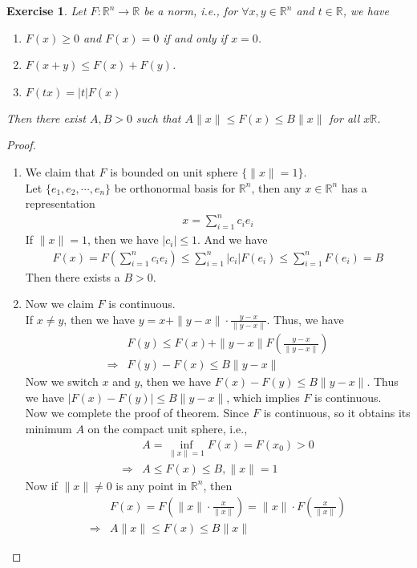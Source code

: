 \documentclass[12pt,leqno]{amsart}
\newtheorem{exercise}{Exercise}[section]
\theoremstyle{definition}
\numberwithin{equation}{subsection}
\begin{document}
\begin{exercise}
Let $F:\mathbb{R}^n\to\mathbb{R}$ be a norm, i.e., for $\forall x,y\in \mathbb{R}^n$ and $t\in\mathbb{R}$, we have
\begin{enumerate}
    \item $F(x)\geq 0$ and $F(x) = 0$ if and only if $x = 0$.
    \item $F(x+y)\leq F(x) + F(y)$.
    \item $F(tx) = |t|F(x)$
\end{enumerate}
Then there exist $A,B > 0$ such that $A\|x\|\leq F(x)\leq B\|x\|$ for all $x\mathbb{R}$.
\end{exercise}
\begin{proof}
~\begin{enumerate}
    \item We claim that $F$ is bounded on unit sphere $\{\|x\| = 1\}$. \\
    Let $\{e_1,e_2,\cdots,e_n\}$ be orthonormal basis for $\mathbb{R}^n$, then any $x\in\mathbb{R}^n$ has a representation
    \begin{align*}
        x = \sum^n_{i=1} c_ie_i
    \end{align*}
    If $\|x\| = 1$, then we have $|c_i| \leq 1$. And we have 
    \begin{align*}
        F(x) = F\left(\sum^n_{i=1} c_ie_i\right) \leq \sum^n_{i=1} |c_i| F(e_i) \leq \sum^n_{i=1} F(e_i) = B
    \end{align*}
    Then there exists a $B > 0$.
    \item Now we claim $F$ is continuous. \\
    If $x \neq y$, then we have $y = x + \|y-x\|\cdot \frac{y-x}{\|y-x\|}$. Thus, we have
    \begin{align*}
        & F(y) \leq F(x) + \|y-x\| F \left(\frac{y-x}{\|y-x\|}\right) \\
        \Rightarrow & F(y) - F(x) \leq B\|y-x\|
    \end{align*}
    Now we switch $x$ and $y$, then we have $F(x) - F(y) \leq B\|y-x\|$. Thus we have $|F(x) - F(y)|\leq B \|y-x\|$, which implies $F$ is continuous. \\

    Now we complete the proof of theorem. Since $F$ is continuous, so it obtains its minimum $A$ on the compact unit sphere, i.e.,
    \begin{align*}
        & A = \inf_{\|x\| = 1}F(x) = F(x_0) > 0 \\
        \Rightarrow & A\leq F(x) \leq B, \|x\| = 1
    \end{align*}
    Now if $\|x\|\neq 0$ is any point in $\mathbb{R}^n$, then 
    \begin{align*}
        & F(x) = F\left(\|x\|\cdot\frac{x}{\|x\|}\right) = \|x\|\cdot F\left(\frac{x}{\|x\|}\right) \\
        \Rightarrow & A\|x\|\leq F(x)\leq B\|x\|
    \end{align*}
\end{enumerate}
\end{proof}
\end{document}
